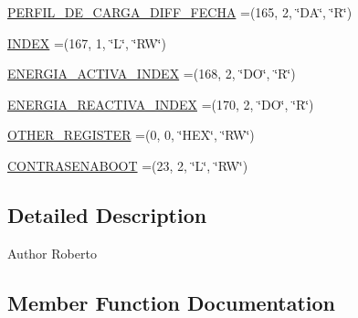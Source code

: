 \begin{DoxyCompactItemize}
\item 
\hyperlink{enumcom_1_1eneri_1_1scorpio__metertool_1_1devices_1_1_register_abad900454ffb60855c929363036bb6bd}{P\+E\+R\+F\+I\+L\+\_\+\+D\+E\+\_\+\+C\+A\+R\+G\+A\+\_\+\+D\+I\+F\+F\+\_\+\+F\+E\+C\+HA} =(165, 2, \char`\"{}DA\char`\"{}, \char`\"{}R\char`\"{})
\item 
\hyperlink{enumcom_1_1eneri_1_1scorpio__metertool_1_1devices_1_1_register_abb94442758dfde67ca3f6b087c9555ad}{I\+N\+D\+EX} =(167, 1, \char`\"{}L\char`\"{}, \char`\"{}RW\char`\"{})
\item 
\hyperlink{enumcom_1_1eneri_1_1scorpio__metertool_1_1devices_1_1_register_a4fdb87b5d5dfb5dfa3586e1b19cf5aaa}{E\+N\+E\+R\+G\+I\+A\+\_\+\+A\+C\+T\+I\+V\+A\+\_\+\+I\+N\+D\+EX} =(168, 2, \char`\"{}DO\char`\"{}, \char`\"{}R\char`\"{})
\item 
\hyperlink{enumcom_1_1eneri_1_1scorpio__metertool_1_1devices_1_1_register_a50d6f256f88d3372594d2ef672052c9e}{E\+N\+E\+R\+G\+I\+A\+\_\+\+R\+E\+A\+C\+T\+I\+V\+A\+\_\+\+I\+N\+D\+EX} =(170, 2, \char`\"{}DO\char`\"{}, \char`\"{}R\char`\"{})
\item 
\hyperlink{enumcom_1_1eneri_1_1scorpio__metertool_1_1devices_1_1_register_a45554890900994e2cfa582a336fe2211}{O\+T\+H\+E\+R\+\_\+\+R\+E\+G\+I\+S\+T\+ER} =(0, 0, \char`\"{}H\+EX\char`\"{}, \char`\"{}RW\char`\"{})
\item 
\hyperlink{enumcom_1_1eneri_1_1scorpio__metertool_1_1devices_1_1_register_a3556b77355637efd22e41e2b8e1cc10b}{C\+O\+N\+T\+R\+A\+S\+E\+N\+A\+B\+O\+OT} =(23, 2, \char`\"{}L\char`\"{}, \char`\"{}RW\char`\"{})
\end{DoxyCompactItemize}


\subsection{Detailed Description}
\begin{DoxyAuthor}{Author}
Roberto 
\end{DoxyAuthor}


\subsection{Member Function Documentation}
\mbox{\label{enumcom_1_1eneri_1_1scorpio__metertool_1_1devices_1_1_register_a0641c682938b90c5353e19c0d9b32973}} 
